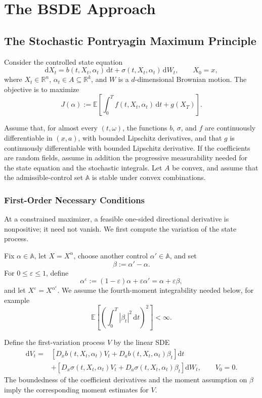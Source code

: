 \chapter{The BSDE Approach}

\section{The Stochastic Pontryagin Maximum Principle}

Consider the controlled state equation
\[
\mathrm dX_t
=b(t,X_t,\alpha_t)\,\mathrm dt
+\sigma(t,X_t,\alpha_t)\,\mathrm dW_t,
\qquad X_0=x,
\]
where \(X_t\in\mathbb R^n\), \(\alpha_t\in A\subseteq\mathbb R^k\), and \(W\) is a \(d\)-dimensional Brownian motion. The objective is to maximize
\[
J(\alpha)
:=\mathbb E\!\left[
\int_0^T f(t,X_t,\alpha_t)\,\mathrm dt
+g(X_T)
\right].
\]

Assume that, for almost every \((t,\omega)\), the functions \(b\), \(\sigma\), and \(f\) are continuously differentiable in \((x,a)\), with bounded Lipschitz derivatives, and that \(g\) is continuously differentiable with bounded Lipschitz derivative. If the coefficients are random fields, assume in addition the progressive measurability needed for the state equation and the stochastic integrals. Let \(A\) be convex, and assume that the admissible-control set \(\mathbb A\) is stable under convex combinations.

\subsection{First-Order Necessary Conditions}

At a constrained maximizer, a feasible one-sided directional derivative is nonpositive; it need not vanish. We first compute the variation of the state process.

Fix \(\alpha\in\mathbb A\), let \(X=X^\alpha\), choose another control \(\alpha'\in\mathbb A\), and set
\[
\beta:=\alpha'-\alpha.
\]
For \(0\le\varepsilon\le1\), define
\[
\alpha^\varepsilon
:=(1-\varepsilon)\alpha+\varepsilon\alpha'
=\alpha+\varepsilon\beta,
\]
and let \(X^\varepsilon=X^{\alpha^\varepsilon}\). We assume the fourth-moment integrability needed below, for example
\[
\mathbb E\!\left[
\left(\int_0^T|\beta_t|^2\,\mathrm dt\right)^2
\right]<\infty.
\]

Define the first-variation process \(V\) by the linear SDE
\[
\begin{aligned}
\mathrm dV_t
={}&\left[
D_xb(t,X_t,\alpha_t)V_t
+D_ab(t,X_t,\alpha_t)\beta_t
\right]\mathrm dt\\
&+\left[
D_x\sigma(t,X_t,\alpha_t)V_t
+D_a\sigma(t,X_t,\alpha_t)\beta_t
\right]\mathrm dW_t,
\qquad V_0=0.
\end{aligned}
\]
The boundedness of the coefficient derivatives and the moment assumption on \(\beta\) imply the corresponding moment estimates for \(V\).

